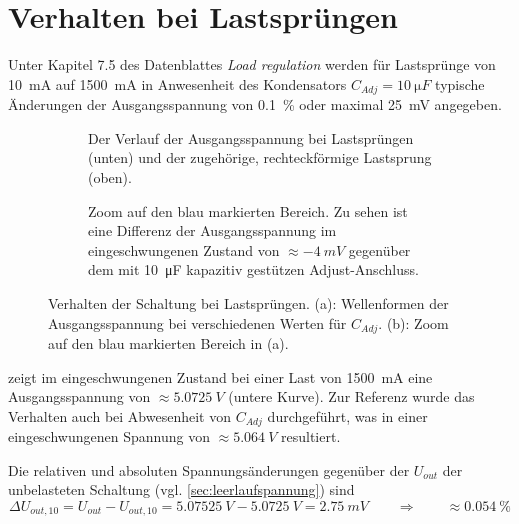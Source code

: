 	\section{Verhalten bei Lastsprüngen}
		Unter Kapitel 7.5 des Datenblattes \textit{Load regulation} werden für Lastsprünge von \SI{10}{mA} auf \SI{1500}{mA} in Anwesenheit des Kondensators \(C_{Adj} = \SI{10}{\micro F}\)
		typische Änderungen der Ausgangsspannung von \SI{0,1}{\percent} oder maximal \SI{25}{mV} angegeben.\par
		\begin{figure}[h]
			\begin{subfigure}[]{\textwidth}
				\centering
				
				\caption[]{Der Verlauf der Ausgangsspannung bei Lastsprüngen (unten) und der zugehörige, rechteckförmige Lastsprung (oben).}
				\label{subfig:load transient response}
			\end{subfigure}
			\vspace{3mm}
			\begin{subfigure}[]{\textwidth}
				
				\caption[]{Zoom auf den blau markierten Bereich. Zu sehen ist eine Differenz der Ausgangsspannung im eingeschwungenen Zustand von \(\approx \SI{-4}{mV}\) gegenüber dem
				mit \SI{10}{\micro F} kapazitiv gestützen Adjust-Anschluss.}
				\label{subfig:load transient response deltaU}
			\end{subfigure}
			\caption[Verhalten der Schaltung bei Lastsprüngen]{Verhalten der Schaltung bei Lastsprüngen. (a): Wellenformen der Ausgangsspannung bei verschiedenen Werten für \(C_{Adj}\).
			(b): Zoom auf den blau markierten Bereich in (a).}
		\end{figure}
		 zeigt im eingeschwungenen Zustand bei einer Last von \SI{1500}{mA} eine
		Ausgangsspannung von \(\approx \SI{5,0725}{V}\) (untere Kurve). Zur Referenz wurde das Verhalten auch bei Abwesenheit von \(C_{Adj}\) durchgeführt, was
		in einer eingeschwungenen Spannung von \(\approx \SI{5,064}{V}\) resultiert.\par
		Die relativen und absoluten Spannungsänderungen gegenüber der \(U_{out}\) der unbelasteten Schaltung (vgl. \cref{sec:leerlaufspannung}) sind
		\begin{equation}
			\Delta U_{out,10} = U_{out} - U_{out,10} = \SI{5,07525}{V} - \SI{5,0725}{V} = \SI{2,75}{mV} \qquad \Rightarrow \qquad \approx \SI{0,054}{\percent}
		\end{equation}
